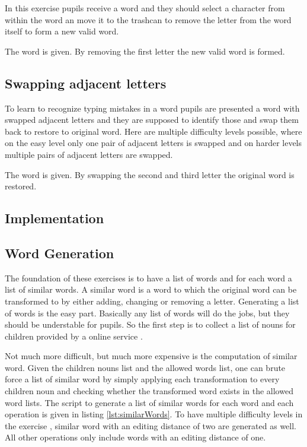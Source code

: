 In this exercise pupils receive a word and they should select a character from within the word an move it to the trashcan to remove the letter from the word itself to form a new valid word.

\begin{example}
    The word  is given. By removing the first letter the new valid word  is formed.
\end{example}

\subsection*{Swapping adjacent letters}

To learn to recognize typing mistakes in a word pupils are presented a word with swapped adjacent letters and they are supposed to identify those and swap them back to restore to original word. Here are multiple difficulty levels possible, where on the easy level only one pair of adjacent letters is swapped and on harder levels multiple pairs of adjacent letters are swapped.

\begin{example}
    The word  is given. By swapping the second and third letter the original word  is restored.
\end{example}

\subsection{Implementation}

\subsection*{Word Generation}

The foundation of these exercises is to have a list of words and for each word a list of similar words. A similar word is a word to which the original word can be transformed to by either adding, changing or removing a letter. Generating a list of words is the easy part. Basically any list of words will do the jobs, but they should be understable for pupils. So the first step is to collect a list of nouns for children provided by a online service \cite{}. 

Not much more difficult, but much more expensive is the computation of similar word. Given the children nouns list and the allowed words list, one can brute force a list of similar word by simply applying each transformation to every children noun and checking whether the transformed word exists in the allowed word lists. The script to generate a list of similar words for each word and each operation is given in listing \ref{lst:similarWords}. To have multiple difficulty levels in the exercise , similar word with an editing distance of two are generated as well. All other operations only include words with an editing distance of one.

